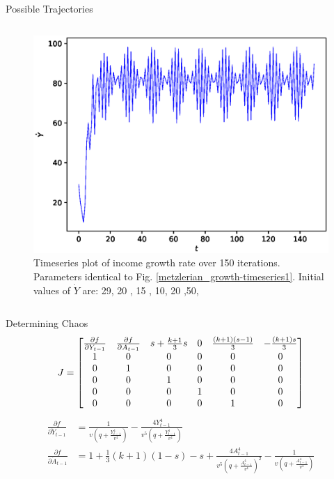 \documentclass{beamer}
\begin{document}
\begin{frame}{Possible Trajectories}
\begin{columns}
\begin{column}{0.5\textwidth}
\begin{figure}
			\includegraphics[width=1.0\textwidth]{timeseries3.eps}
			\caption{Timeseries plot of income growth rate over 150 iterations. Parameters identical to Fig. \ref{metzlerian_growth-timeseries1}. Initial values of $\dot Y$ are: 29, 20 , 15 , 10, 20 ,50,}
		\end{figure}
	\end{column}
	\end{columns}
\end{frame}

\begin{frame}{Determining Chaos}
	\begin{equation*}
		J=
		\begin{bmatrix}\small
			\frac{\partial f}{\partial Y_{t-1}} & \frac{\partial f}{\partial A_{t-1}} & s+\frac{k+1}{3}s & 0 & \frac{(k+1)(s-1)}{3} & -\frac{(k+1)s}{3}\\
			1 & 0 & 0 & 0 & 0 & 0\\
			0 & 1 & 0 & 0 & 0 & 0\\
			0 & 0 & 1 & 0 & 0 & 0\\
			0 & 0 & 0 & 1 & 0 & 0\\
			0 & 0 & 0 & 0 & 1 & 0
		\end{bmatrix}
	\end{equation*}
	\begin{align*}
		\frac{\partial f}{\partial \dot Y_{t-1}}&= \frac{1}{v\left(q+\frac{Y_{t-1}^4}{v^4}\right)}-\frac{4Y_{t-1}^4}{v^5\left(q+\frac{Y_{t-1}^4}{v^4}\right)}\\
		\frac{\partial f}{\partial \dot A_{t-1}}&=1+\frac{1}{3}(k+1)(1-s)-s+\frac{4A_{t-1}^4}{v^5\left(q+\frac{A_{t-1}^4}{v^4}\right)^2}-\frac{1}{v\left(q+\frac{A_{t-1}^4}{v^4}\right)}
	\end{align*}
\end{frame}
\end{document}
